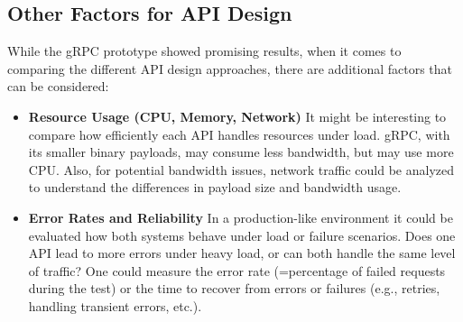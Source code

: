 \subsection{Other Factors for API Design}

While the gRPC prototype showed promising results, when it comes to comparing the different API design approaches, there are additional factors that can be considered:

\begin{itemize}
    \item \textbf{Resource Usage (CPU, Memory, Network)}
    It might be interesting to compare how efficiently each API handles resources under load. gRPC, with its smaller binary payloads, may consume less bandwidth, but may use more CPU. 
    Also, for potential bandwidth issues, network traffic could be analyzed to understand the differences in payload size and bandwidth usage.
    
    \item \textbf{Error Rates and Reliability}
    In a production-like environment it could be evaluated how both systems behave under load or failure scenarios. Does one API lead to more errors under heavy load, or can both handle the same level of traffic? One could measure the error rate (=percentage of failed requests during the test) or the time to recover from errors or failures (e.g., retries, handling transient errors, etc.).
\end{itemize}

